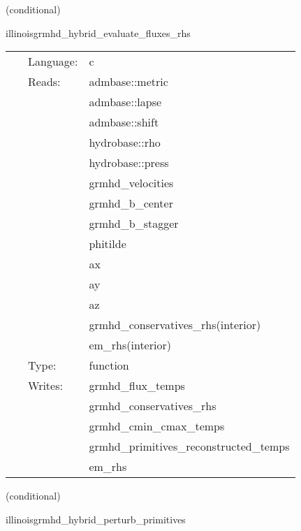 \vspace{5mm}

   (conditional) 

\hspace{5mm} illinoisgrmhd\_hybrid\_evaluate\_fluxes\_rhs 

\hspace{5mm}{\it hybrid version of illinoisgrmhd\_evaluate\_fluxes\_rhs } 


\hspace{5mm}

 \begin{tabular*}{160mm}{cll} 
~ & Language:  & c \\ 
~ & Reads:  & admbase::metric \\ 
~& ~ &admbase::lapse\\ 
~& ~ &admbase::shift\\ 
~& ~ &hydrobase::rho\\ 
~& ~ &hydrobase::press\\ 
~& ~ &grmhd\_velocities\\ 
~& ~ &grmhd\_b\_center\\ 
~& ~ &grmhd\_b\_stagger\\ 
~& ~ &phitilde\\ 
~& ~ &ax\\ 
~& ~ &ay\\ 
~& ~ &az\\ 
~& ~ &grmhd\_conservatives\_rhs(interior)\\ 
~& ~ &em\_rhs(interior)\\ 
~ & Type:  & function \\ 
~ & Writes:  & grmhd\_flux\_temps \\ 
~& ~ &grmhd\_conservatives\_rhs\\ 
~& ~ &grmhd\_cmin\_cmax\_temps\\ 
~& ~ &grmhd\_primitives\_reconstructed\_temps\\ 
~& ~ &em\_rhs\\ 
\end{tabular*} 


\vspace{5mm}

   (conditional) 

\hspace{5mm} illinoisgrmhd\_hybrid\_perturb\_primitives 

\hspace{5mm}{\it hybrid version of illinoisgrmhd\_perturb\_primitives } 


